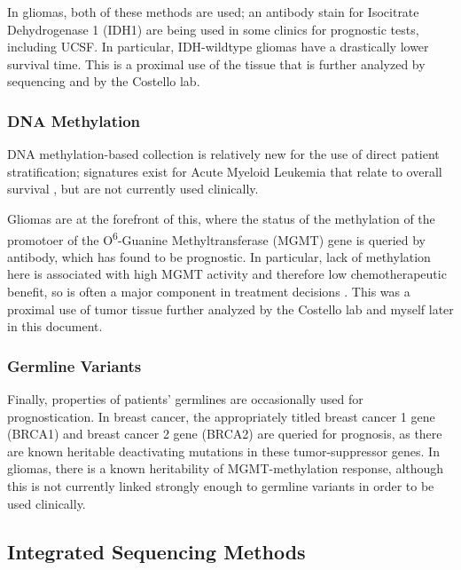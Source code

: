       In gliomas, both of these methods are used; an antibody stain for Isocitrate Dehydrogenase 1
      (IDH1) are being used in some clinics for prognostic tests,
      including UCSF. In particular, IDH-wildtype gliomas have a
      drastically lower survival time.
      This is a proximal use of the tissue that is
      further analyzed by sequencing and by the Costello lab. 

      \subsubsection{DNA Methylation}

      DNA methylation-based collection is relatively new for the use
      of direct patient stratification; signatures exist for Acute
      Myeloid Leukemia that relate to overall survival
      \cite{figueroa_dna_2010}, but are not currently used
      clinically. 

      Gliomas are at the forefront of this, where the
      status of the methylation of the promotoer of the
      O\textsuperscript{6}-Guanine Methyltransferase (MGMT) gene is
     queried by antibody, which has found to be prognostic. In particular, lack of
      methylation here is associated with high MGMT activity and
      therefore low chemotherapeutic benefit, so is often a major
      component in treatment decisions \cite{rapkins_mgmt_2015}. This
      was a proximal use of tumor tissue further analyzed by the
      Costello lab and myself later in this document.


      \subsubsection{Germline Variants}
      Finally, properties of patients' germlines are occasionally used
      for prognostication. In breast cancer, the appropriately titled
      breast cancer 1 gene (BRCA1) and breast cancer 2 gene (BRCA2)
      are queried for prognosis, as there are known heritable
      deactivating mutations in these tumor-suppressor genes. In
      gliomas, there is a known heritability of MGMT-methylation
      response, although this is not currently linked strongly enough
      to germline variants in order to be used clinically.

      \subsection{Integrated Sequencing Methods}

